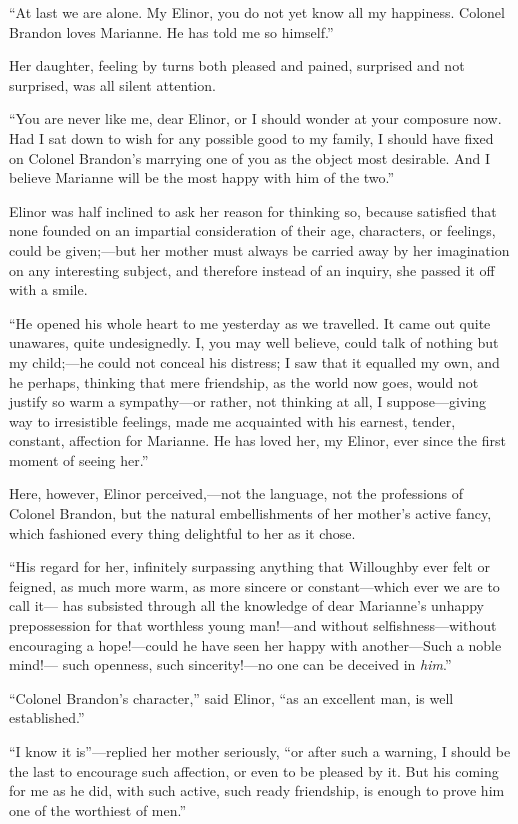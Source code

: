 ``At last we are alone.  My Elinor, you do not yet
know all my happiness.  Colonel Brandon loves Marianne.
He has told me so himself.''

Her daughter, feeling by turns both pleased and pained,
surprised and not surprised, was all silent attention.

``You are never like me, dear Elinor, or I should
wonder at your composure now.  Had I sat down to wish
for any possible good to my family, I should have fixed
on Colonel Brandon's marrying one of you as the object
most desirable.  And I believe Marianne will be the most
happy with him of the two.''

Elinor was half inclined to ask her reason for thinking so,
because satisfied that none founded on an impartial
consideration of their age, characters, or feelings,
could be given;---but her mother must always be carried
away by her imagination on any interesting subject,
and therefore instead of an inquiry, she passed it off with a
smile.

``He opened his whole heart to me yesterday as we travelled.
It came out quite unawares, quite undesignedly.  I, you may
well believe, could talk of nothing but my child;---he could
not conceal his distress; I saw that it equalled my own,
and he perhaps, thinking that mere friendship, as the world
now goes, would not justify so warm a sympathy---or rather,
not thinking at all, I suppose---giving way to irresistible
feelings, made me acquainted with his earnest, tender, constant,
affection for Marianne.  He has loved her, my Elinor, ever since
the first moment of seeing her.''

Here, however, Elinor perceived,---not the language,
not the professions of Colonel Brandon, but the natural
embellishments of her mother's active fancy, which fashioned
every thing delightful to her as it chose.

``His regard for her, infinitely surpassing anything
that Willoughby ever felt or feigned, as much more warm,
as more sincere or constant---which ever we are to call it---%
has subsisted through all the knowledge of dear Marianne's
unhappy prepossession for that worthless young man!---and
without selfishness---without encouraging a hope!---could
he have seen her happy with another---Such a noble mind!---%
such openness, such sincerity!---no one can be deceived
in \emph{him}.''

``Colonel Brandon's character,'' said Elinor,
``as an excellent man, is well established.''

``I know it is''---replied her mother seriously, ``or
after such a warning, I should be the last to encourage
such affection, or even to be pleased by it.  But his coming
for me as he did, with such active, such ready friendship,
is enough to prove him one of the worthiest of men.''

